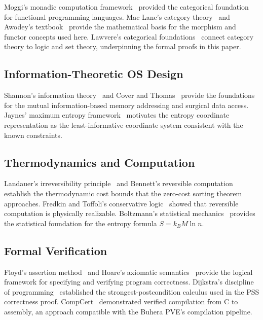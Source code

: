 \documentclass[12pt,twocolumn]{article}
\begin{document}
Moggi's monadic computation framework~\cite{moggi1991notions} provided the categorical foundation for functional programming languages. Mac Lane's category theory~\cite{maclane1998categories} and Awodey's textbook~\cite{awodey2010category} provide the mathematical basis for the morphism and functor concepts used here. Lawvere's categorical foundations~\cite{lawvere2003sets} connect category theory to logic and set theory, underpinning the formal proofs in this paper.

\subsection{Information-Theoretic OS Design}

Shannon's information theory~\cite{shannon1949mathematical} and Cover and Thomas~\cite{cover2006elements} provide the foundations for the mutual information-based memory addressing and surgical data access. Jaynes' maximum entropy framework~\cite{jaynes1957information} motivates the entropy coordinate representation as the least-informative coordinate system consistent with the known constraints.

\subsection{Thermodynamics and Computation}

Landauer's irreversibility principle~\cite{landauer1961irreversibility} and Bennett's reversible computation~\cite{bennett1973logical} establish the thermodynamic cost bounds that the zero-cost sorting theorem approaches. Fredkin and Toffoli's conservative logic~\cite{fredkin1982conservative} showed that reversible computation is physically realizable. Boltzmann's statistical mechanics~\cite{boltzmann1896vorlesungen} provides the statistical foundation for the entropy formula $S = k_B M \ln n$.

\subsection{Formal Verification}

Floyd's assertion method~\cite{floyd1967assigning} and Hoare's axiomatic semantics~\cite{hoare1969axiomatic} provide the logical framework for specifying and verifying program correctness. Dijkstra's discipline of programming~\cite{dijkstra1976discipline} established the strongest-postcondition calculus used in the PSS correctness proof. CompCert~\cite{leroy2009formal} demonstrated verified compilation from C to assembly, an approach compatible with the Buhera PVE's compilation pipeline.
\end{document}
